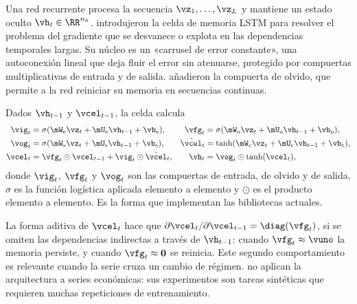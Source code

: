 Una red recurrente procesa la secuencia $\vz_1,\dots,\vz_L$ y mantiene un estado oculto
$\vh_t\in\RR^{n_h}$. \textcite{hochreiter_schmidhuber_1997} introdujeron la celda
de memoria LSTM para resolver el problema del gradiente que se desvanece o explota en las
dependencias temporales largas. Su núcleo es un «carrusel de error constante», una autoconexión
lineal que deja fluir el error sin atenuarse, protegido por compuertas multiplicativas de entrada y
de salida. \textcite{gers_schmidhuber_cummins_2000} añadieron la compuerta de olvido, que permite a la red reiniciar su memoria en secuencias
continuas.

\begin{definicion}\label{def:lstm}
Dados $\vh_{t-1}$ y $\vcel_{t-1}$, la celda calcula
\begin{equation}\label{eq:lstm}
\begin{aligned}
  \vig_t&=\sigma(\mW_{\mathrm e}\vz_t+\mU_{\mathrm e}\vh_{t-1}+\vb_{\mathrm e}), &
  \vfg_t&=\sigma(\mW_{\mathrm o}\vz_t+\mU_{\mathrm o}\vh_{t-1}+\vb_{\mathrm o}),\\
  \vog_t&=\sigma(\mW_{\mathrm s}\vz_t+\mU_{\mathrm s}\vh_{t-1}+\vb_{\mathrm s}), &
  \tilde\vcel_t&=\tanh(\mW_{\mathrm c}\vz_t+\mU_{\mathrm c}\vh_{t-1}+\vb_{\mathrm c}),\\
  \vcel_t&=\vfg_t\odot\vcel_{t-1}+\vig_t\odot\tilde\vcel_t, &
  \vh_t&=\vog_t\odot\tanh(\vcel_t),
\end{aligned}
\end{equation}
donde $\vig_t$, $\vfg_t$ y $\vog_t$ son las compuertas de entrada, de olvido y de salida, $\sigma$
es la función logística aplicada elemento a elemento y $\odot$ es el producto elemento a elemento.
Es la forma que implementan las bibliotecas actuales.
\end{definicion}

La forma aditiva de $\vcel_t$ hace que $\partial\vcel_t/\partial\vcel_{t-1}=\diag(\vfg_t)$, si se
omiten las dependencias indirectas a través de $\vh_{t-1}$: cuando $\vfg_t\approx\vuno$ la memoria
persiste, y cuando $\vfg_t\approx\mathbf{0}$ se reinicia. Este segundo comportamiento es relevante
cuando la serie cruza un cambio de régimen. \textcite{hochreiter_schmidhuber_1997} no aplican la
arquitectura a series económicas: sus experimentos son tareas sintéticas que requieren muchas
repeticiones de entrenamiento.

